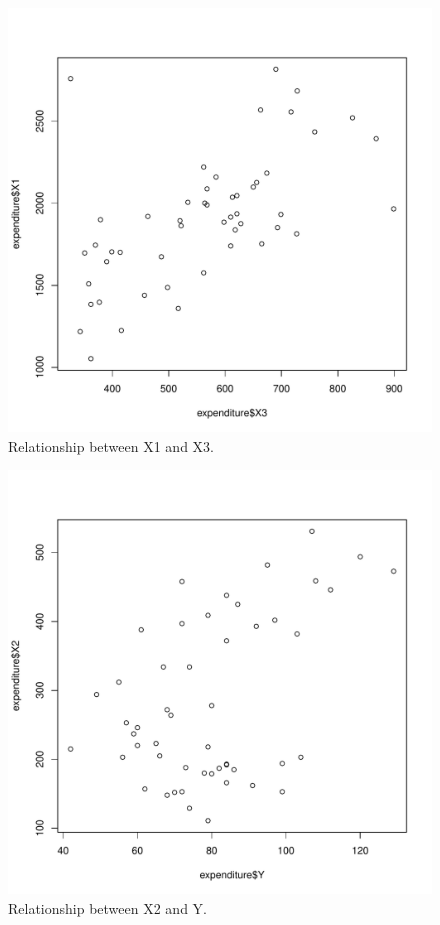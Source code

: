 \documentclass[12pt,letterpaper]{article}
\begin{document}
\begin{itemize}
\begin{figure}[hbtp!]\centering
	\caption{\footnotesize Relationship between X1 and X3.}
	\label{fig:plot_6}
	\includegraphics[width=.75\textwidth]{plot_X1_X3.pdf}
\end{figure}

\begin{figure}[hbtp!]\centering
	\caption{\footnotesize Relationship between X2 and Y.}
	\label{fig:plot_7}
	\includegraphics[width=.75\textwidth]{plot_X2_Y.pdf}
\end{figure}


\end{itemize}
\end{document}
